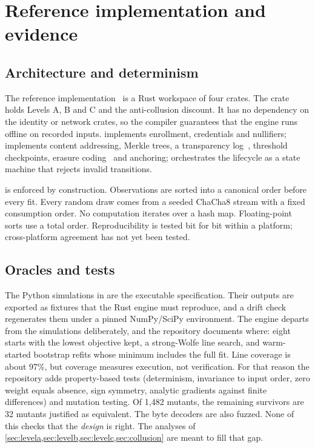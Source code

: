 \section{Reference implementation and evidence}\label{sec:implementation}

\subsection{Architecture and determinism}

The reference implementation~\cite{isegoria-repo} is a Rust workspace of four crates. The
 crate holds Levels A, B and C and the anti-collusion discount. It has no dependency
on the identity or network crates, so the compiler guarantees that the engine runs offline on
recorded inputs.  implements enrollment, credentials and nullifiers; 
implements content addressing, Merkle trees, a transparency log~\cite{crosby2009tamper,rfc6962},
threshold checkpoints, erasure coding~\cite{reed1960} and anchoring;  orchestrates
the lifecycle as a state machine that rejects invalid transitions.

 is enforced by construction. Observations are sorted into a canonical order
before every fit. Every random draw comes from a seeded ChaCha8 stream with a fixed consumption
order. No computation iterates over a hash map. Floating-point sorts use a total order.
Reproducibility is tested bit for bit within a platform; cross-platform agreement has not yet been
tested.

\subsection{Oracles and tests}

The Python simulations in  are the executable specification. Their outputs are
exported as fixtures that the Rust engine must reproduce, and a drift check regenerates them under
a pinned NumPy/SciPy environment. The engine departs from the simulations deliberately, and the
repository documents where: eight starts with the lowest objective kept, a strong-Wolfe line
search, and warm-started bootstrap refits whose minimum includes the full fit. Line coverage is
about 97\%, but coverage measures execution, not verification. For that reason the repository adds
property-based tests (determinism, invariance to input order, zero weight equals absence,
sign symmetry, analytic gradients against finite differences) and mutation testing. Of 1{,}482
mutants, the remaining survivors are 32 mutants justified as equivalent. The byte decoders are also
fuzzed. None of this checks that the \emph{design} is right. The analyses of
\cref{sec:levela,sec:levelb,sec:levelc,sec:collusion} are meant to fill that gap.

